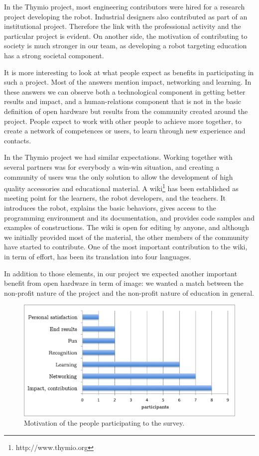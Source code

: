 \documentclass[letterpaper, 10 pt, conference]{ieeeconf}  %
\begin{document}
In the Thymio project, most engineering contributors were hired for a research project developing the robot. 
Industrial designers also contributed as part of an institutional project.
Therefore the link with the professional activity and the particular project is evident.
On another side, the motivation of contributing to society is much stronger in our team, as developing a robot targeting education has a strong societal component.

It is more interesting to look at what people expect as benefits in participating in such a project.
Most of the answers mention impact, networking and learning. 
In these answers we can observe both a technological component in getting better results and impact, and a human-relations component that is not in the basic definition of open hardware but results from the community created around the project. 
People expect to work with other people to achieve more together, to create a network of competences or users, to learn through new experience and contacts. 

In the Thymio project we had similar expectations. 
Working together with several partners was for everybody a win-win situation, and creating a community of users was the only solution to allow the development of high quality accessories and educational material.
A wiki\footnote{http://www.thymio.org} has been established as meeting point for the learners, the robot developers, and the teachers.
It introduces the robot, explains the basic behaviors, gives access to the programming environment and its documentation, and provides code samples and examples of constructions.
The wiki is open for editing by anyone, and although we initially provided most of the material, the other members of the community have started to contribute.
One of the most important contribution to the wiki, in term of effort, has been its translation into four languages.

In addition to those elements, in our project we expected another important benefit from open hardware in term of image: we wanted a match between the non-profit nature of the project and the non-profit nature of education in general. 

\begin{figure}
\centering
\includegraphics[width=.7\columnwidth]{figures/getout}
\caption{Motivation of the people participating to the survey.}
\label{fig:getout}
\end{figure}
\end{document}
